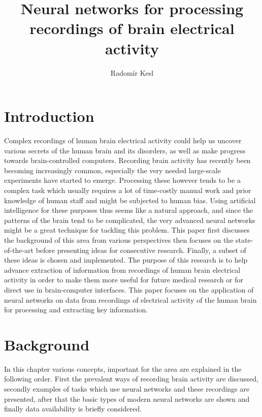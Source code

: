\documentclass[eng,BP]{thesiskiv}
\author{Radomír Kesl}
\title{Neural networks for processing recordings of brain electrical activity}
\begin{document}
\maketitle
\tableofcontents


\chapter{Introduction}

Complex recordings of human brain electrical activity could help us uncover various secrets of the human brain and its disorders, as well as make progress towards brain-controlled computers.
Recording brain activity has recently been becoming increasingly common, especially the very needed large-scale experiments have started to emerge. Processing these however tends to be a complex task which usually requires a lot of time-costly manual work and prior knowledge of human staff and might be subjected to human bias. Using artificial intelligence for these purposes thus seems like a natural approach, and since the patterns of the brain tend to be complicated, the very advanced neural networks might be a great technique for tackling this problem.
This paper first discusses the background of this area from various perspectives then focuses on the state-of-the-art before presenting ideas for consecutive research. Finally, a subset of these ideas is chosen and implemented.
The purpose of this research is to help advance extraction of information from recordings of human brain electrical activity in order to make them more useful  for future medical research or for direct use in brain-computer interfaces.
This paper focuses on the application of neural networks on data from recordings of electrical activity of the human brain for processing and extracting key information.


\chapter{Background}

In this chapter various concepts, important for the area are explained in the following order. First the prevalent ways of recording brain activity are discussed, secondly examples of tasks which use neural networks and these recordings are presented, after that the basic types of modern neural networks are shown and finally data availability is briefly considered.
\end{document}

